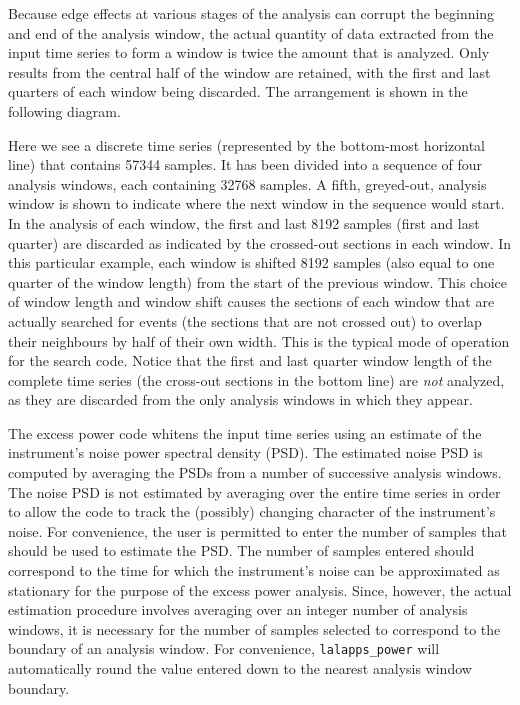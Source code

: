 \documentclass[10pt]{article}
\newcommand{\prog}[1]{\texttt{#1}}
\begin{document}
Because edge effects at various stages of the analysis can corrupt the
beginning and end of the analysis window, the actual quantity of data
extracted from the input time series to form a window is twice the amount
that is analyzed.  Only results from the central half of the window are
retained, with the first and last quarters of each window being discarded.
The arrangement is shown in the following diagram.
\begin{center}

\end{center}
Here we see a discrete time series (represented by the bottom-most
horizontal line) that contains 57344 samples.  It has been divided into a
sequence of four analysis windows, each containing 32768 samples.  A fifth,
greyed-out, analysis window is shown to indicate where the next window in
the sequence would start.  In the analysis of each window, the first and
last 8192 samples (first and last quarter) are discarded as indicated by
the crossed-out sections in each window.  In this particular example, each
window is shifted 8192 samples (also equal to one quarter of the window
length) from the start of the previous window.  This choice of window
length and window shift causes the sections of each window that are
actually searched for events (the sections that are not crossed out) to
overlap their neighbours by half of their own width.  This is the typical
mode of operation for the search code.  Notice that the first and last
quarter window length of the complete time series (the cross-out sections
in the bottom line) are \emph{not} analyzed, as they are discarded from the
only analysis windows in which they appear.

The excess power code whitens the input time series using an estimate of
the instrument's noise power spectral density (PSD).  The estimated noise
PSD is computed by averaging the PSDs from a number of successive analysis
windows.  The noise PSD is not estimated by averaging over the entire time
series in order to allow the code to track the (possibly) changing
character of the instrument's noise.  For convenience, the user is
permitted to enter the number of samples that should be used to estimate
the PSD.  The number of samples entered should correspond to the time for
which the instrument's noise can be approximated as stationary for the
purpose of the excess power analysis.  Since, however, the actual
estimation procedure involves averaging over an integer number of analysis
windows, it is necessary for the number of samples selected to correspond
to the boundary of an analysis window.  For convenience,
\prog{lalapps\_power} will automatically round the value entered down to
the nearest analysis window boundary.
\end{document}
